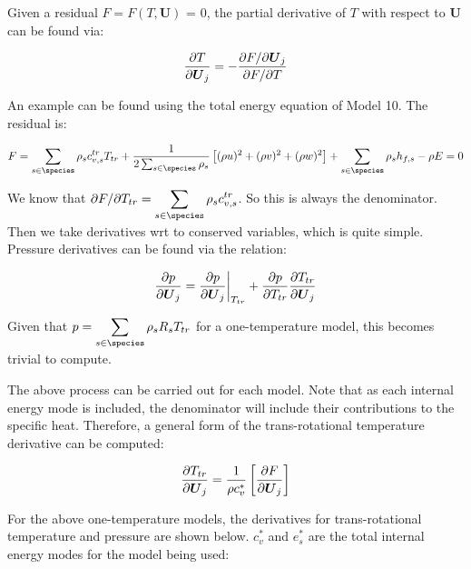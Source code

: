 \documentclass[10pt]{article}
\begin{document}
\begin{flushleft}
\begin{derivation}
    Given a residual $F = F(T, \boldsymbol{U})$ = 0, the partial derivative of $T$ with respect to $\boldsymbol{U}$ can be found via:

    \begin{equation*}
        \frac{\partial T}{\partial \boldsymbol{U}_j} = -\frac{\partial F / \partial \boldsymbol{U}_j}{\partial F / \partial T}
    \end{equation*}

    An example can be found using the total energy equation of Model 10. The residual is:
    
    \begin{equation}
        F = \sum_{s \in \species} \rho_s c_{v,s}^{tr} T_{tr} + \frac{1}{2 \sum_{s \in \species} \rho_s} \bb{(\rho u)^2 + (\rho v)^2 + (\rho w)^2} + \sum_{s \in \species} \rho_s h_{f,s} - \rho E= 0
    \end{equation}

    We know that $\partial F / \partial T_{tr} = \displaystyle \sum_{s \in \species} \rho_s c_{v,s}^{tr}$. So this is always the denominator. Then we take derivatives wrt to conserved variables, which is quite simple. Pressure derivatives can be found via the relation:

    \begin{equation*}
        \frac{\partial p}{\partial \boldsymbol{U}_j} = \frac{\partial p}{\partial \boldsymbol{U}_j}\bigg|_{T_{tr}} + \frac{\partial p}{\partial T_{tr}} \frac{\partial T_{tr}}{\partial \boldsymbol{U}_j}
    \end{equation*}

    Given that $p = \displaystyle \sum_{s \in \species} \rho_s R_s T_{tr}$ for a one-temperature model, this becomes trivial to compute.
\end{derivation}

The above process can be carried out for each model. Note that as each internal energy mode is included, the denominator will include their contributions to the specific heat. Therefore, a general form of the trans-rotational temperature derivative can be computed:

\begin{equation*}
    \frac{\partial T_{tr}}{\partial \boldsymbol U_j} = \frac{1}{\rho c_v^*} \left[ \frac{\partial F}{\partial \boldsymbol{U}_j} \right]
\end{equation*}

For the above one-temperature models, the derivatives for trans-rotational temperature and pressure are shown below. $c_v^*$ and $e_s^*$ are the total internal energy modes for the model being used:


\end{flushleft}
\end{document}
